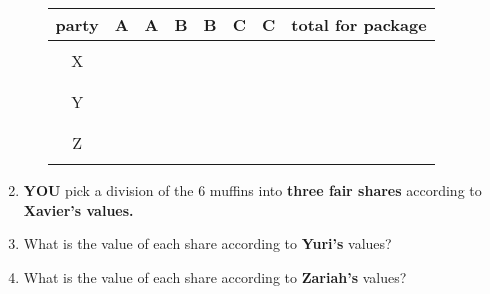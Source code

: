 \documentclass[12pt]{article}
\renewcommand{\emph}[1]{\textsf{\textbf{#1}}}
\begin{document}
\begin{enumerate}
\begin{enumerate}
	\begin{tabular}{c || c | c| c| c | c| c| c}
	party&\quad A \quad  \quad&\quad A \quad  \quad&\quad B \quad\quad&\quad B \quad\quad&\quad C\quad\quad&\quad C\quad\quad&total for package\\
	\hline\hline
	&&&&&&\\
	X&&&&&&\\
	&&&&&& \\
	\hline
	&&&&&& \\
	Y&&&&&&\\
	&&&&&& \\
	\hline
	&&&&&& \\
	Z&&&&&&\\
	&&&&&& \\
	\end{tabular}
	\end{enumerate}
\item \textbf{YOU} pick a division of the 6 muffins into \emph{three fair shares} according to \textbf{Xavier's values.}
\vfill
\item What is the value of  each share according to \textbf{Yuri's} values?\\
\vfill  
\item What is the value of  each share according to \textbf{Zariah's} values?\\
\vfill  
\end{enumerate}
\end{document}
